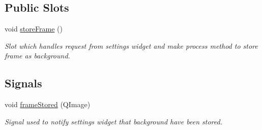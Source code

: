 \subsection*{Public Slots}
\begin{DoxyCompactItemize}
\item 
\hypertarget{class_module_background_a1497e000d7884ab48bc25d151efb66b5}{
void \hyperlink{class_module_background_a1497e000d7884ab48bc25d151efb66b5}{storeFrame} ()}
\label{d0/deb/class_module_background_a1497e000d7884ab48bc25d151efb66b5}

\begin{DoxyCompactList}\small\item\em Slot which handles request from settings widget and make process method to store frame as background. \item\end{DoxyCompactList}\end{DoxyCompactItemize}
\subsection*{Signals}
\begin{DoxyCompactItemize}
\item 
void \hyperlink{class_module_background_a9ad1eacdf4aaefe3dbe6f7ac5f75ad1d}{frameStored} (QImage)
\begin{DoxyCompactList}\small\item\em Signal used to notify settings widget that background have been stored. \item\end{DoxyCompactList}\end{DoxyCompactItemize}

